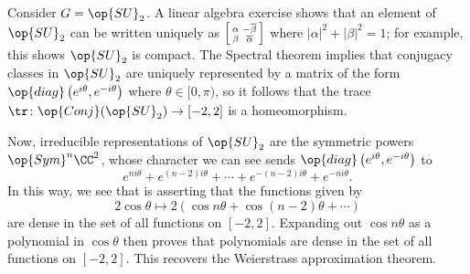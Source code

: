 \documentclass{amsart}
\begin{document}
\begin{example}
	Consider $G=\op{SU}_2$. A linear algebra exercise shows that an element of $\op{SU}_2$ can be written uniquely as $\begin{bsmallmatrix}
		\alpha & -\overline\beta \\ \beta & \overline\alpha
	\end{bsmallmatrix}$ where $\left|\alpha\right|^2+\left|\beta\right|^2=1$; for example, this shows $\op{SU}_2$ is compact. The Spectral theorem implies that conjugacy classes in $\op{SU}_2$ are uniquely represented by a matrix of the form $\op{diag}\left(e^{i\theta},e^{-i\theta}\right)$ where $\theta\in[0,\pi)$, so it follows that the trace $\tr\colon\op{Conj}({\op{SU}_2})\to[-2,2]$ is a homeomorphism.
	
	Now, irreducible representations of $\op{SU}_2$ are the symmetric powers $\op{Sym}^n\CC^2$, whose character we can see sends $\op{diag}\left(e^{i\theta},e^{-i\theta}\right)$ to
	\[e^{ni\theta}+e^{(n-2)i\theta}+\cdots+e^{-(n-2)i\theta}+e^{-ni\theta}.\]
	In this way, we see that  is asserting that the functions given by
	\[2\cos\theta\mapsto2(\cos n\theta+\cos(n-2)\theta+\cdots)\]
	are dense in the set of all functions on $[-2,2]$. Expanding out $\cos n\theta$ as a polynomial in $\cos\theta$ then proves that polynomials are dense in the set of all functions on $[-2,2]$. This recovers the Weierstrass approximation theorem.
\end{example}

\printbibliography[title={References}]
\end{document}
